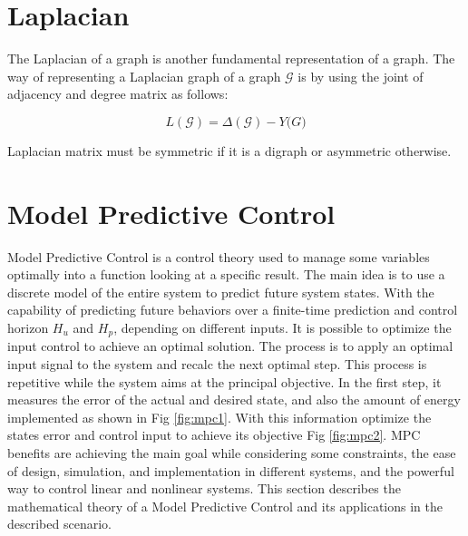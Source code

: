 \section*{Laplacian}

The Laplacian of a graph is another fundamental representation of a graph. The way of representing a Laplacian graph of a graph $\mathcal{G}$ is by using the joint of adjacency and degree matrix as follows:

\begin{equation}
    L(\mathcal{G}) = \Delta (\mathcal{G}) - Y\mathcal(G)
\end{equation}

Laplacian matrix must be symmetric if it is a digraph or asymmetric otherwise. 
















\section{Model Predictive Control}

Model Predictive Control is a control theory used to manage some variables optimally into a function looking at a specific result. The main idea is to use a discrete model of the entire system to predict future system states. With the capability of predicting future behaviors over a finite-time prediction and control horizon $H_u$ and $H_p$, depending on different inputs. It is possible to optimize the input control to achieve an optimal solution. The process is to apply an optimal input signal to the system and recalc the next optimal step. This process is repetitive while the system aims at the principal objective. In the first step, it measures the error of the actual and desired state, and also the amount of energy implemented as shown in Fig  \ref{fig:mpc1}. With this information optimize the states error and control input to achieve its objective Fig \ref{fig:mpc2}. MPC benefits are achieving the main goal while considering some constraints, the ease of design, simulation, and implementation in different systems, and the powerful way to control linear and nonlinear systems. This section describes the mathematical theory of a Model Predictive Control and its applications in the described scenario.


